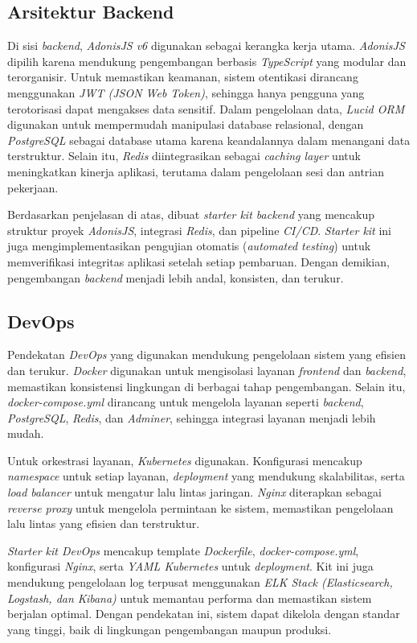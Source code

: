 \subsection{Arsitektur Backend}
Di sisi \emph{backend}, \emph{AdonisJS v6} digunakan sebagai kerangka kerja utama. \emph{AdonisJS} dipilih karena mendukung pengembangan berbasis \emph{TypeScript} yang modular dan terorganisir. Untuk memastikan keamanan, sistem otentikasi dirancang menggunakan \emph{JWT (JSON Web Token)}, sehingga hanya pengguna yang terotorisasi dapat mengakses data sensitif. Dalam pengelolaan data, \emph{Lucid ORM} digunakan untuk mempermudah manipulasi database relasional, dengan \emph{PostgreSQL} sebagai database utama karena keandalannya dalam menangani data terstruktur. Selain itu, \emph{Redis} diintegrasikan sebagai \emph{caching layer} untuk meningkatkan kinerja aplikasi, terutama dalam pengelolaan sesi dan antrian pekerjaan. 

Berdasarkan penjelasan di atas, dibuat \emph{starter kit backend} yang mencakup struktur proyek \emph{AdonisJS}, integrasi \emph{Redis}, dan pipeline \emph{CI/CD}. \emph{Starter kit} ini juga mengimplementasikan pengujian otomatis (\emph{automated testing}) untuk memverifikasi integritas aplikasi setelah setiap pembaruan. Dengan demikian, pengembangan \emph{backend} menjadi lebih andal, konsisten, dan terukur.

\subsection{DevOps}
Pendekatan \emph{DevOps} yang digunakan mendukung pengelolaan sistem yang efisien dan terukur. \emph{Docker} digunakan untuk mengisolasi layanan \emph{frontend} dan \emph{backend}, memastikan konsistensi lingkungan di berbagai tahap pengembangan. Selain itu, \emph{docker-compose.yml} dirancang untuk mengelola layanan seperti \emph{backend}, \emph{PostgreSQL}, \emph{Redis}, dan \emph{Adminer}, sehingga integrasi layanan menjadi lebih mudah.

Untuk orkestrasi layanan, \emph{Kubernetes} digunakan. Konfigurasi mencakup \emph{namespace} untuk setiap layanan, \emph{deployment} yang mendukung skalabilitas, serta \emph{load balancer} untuk mengatur lalu lintas jaringan. \emph{Nginx} diterapkan sebagai \emph{reverse proxy} untuk mengelola permintaan ke sistem, memastikan pengelolaan lalu lintas yang efisien dan terstruktur.

\emph{Starter kit DevOps} mencakup template \emph{Dockerfile}, \emph{docker-compose.yml}, konfigurasi \emph{Nginx}, serta \emph{YAML Kubernetes} untuk \emph{deployment}. Kit ini juga mendukung pengelolaan log terpusat menggunakan \emph{ELK Stack (Elasticsearch, Logstash, dan Kibana)} untuk memantau performa dan memastikan sistem berjalan optimal. Dengan pendekatan ini, sistem dapat dikelola dengan standar yang tinggi, baik di lingkungan pengembangan maupun produksi.

